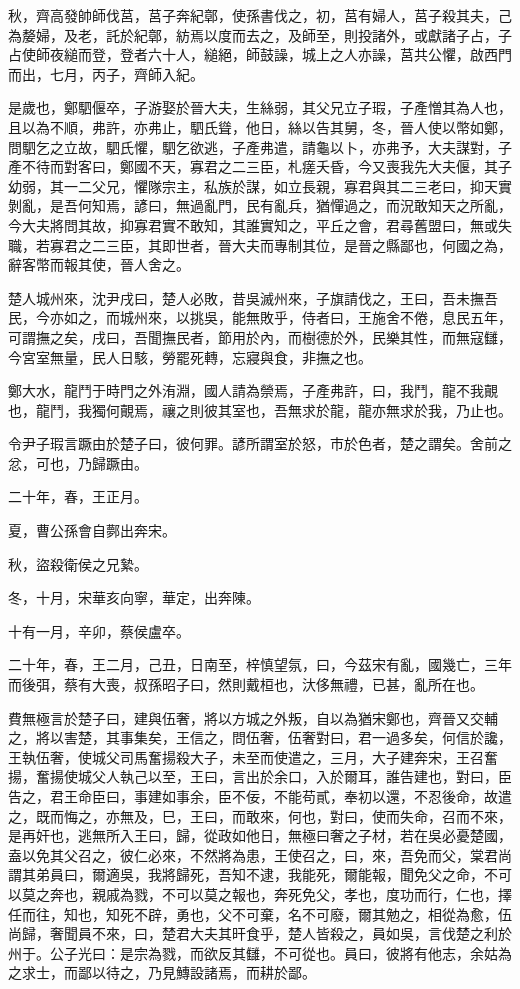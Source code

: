\begin{pinyinscope}
秋，齊高發帥師伐莒，莒子奔紀鄣，使孫書伐之，初，莒有婦人，莒子殺其夫，己為嫠婦，及老，託於紀鄣，紡焉以度而去之，及師至，則投諸外，或獻諸子占，子占使師夜縋而登，登者六十人，縋絕，師鼓譟，城上之人亦譟，莒共公懼，啟西門而出，七月，丙子，齊師入紀。

是歲也，鄭駟偃卒，子游娶於晉大夫，生絲弱，其父兄立子瑕，子產憎其為人也，且以為不順，弗許，亦弗止，駟氏聳，他日，絲以告其舅，冬，晉人使以幣如鄭，問駟乞之立故，駟氏懼，駟乞欲逃，子產弗遣，請龜以卜，亦弗予，大夫謀對，子產不待而對客曰，鄭國不天，寡君之二三臣，札瘥夭昏，今又喪我先大夫偃，其子幼弱，其一二父兄，懼隊宗主，私族於謀，如立長親，寡君與其二三老曰，抑天實剝亂，是吾何知焉，諺曰，無過亂門，民有亂兵，猶憚過之，而況敢知天之所亂，今大夫將問其故，抑寡君實不敢知，其誰實知之，平丘之會，君尋舊盟曰，無或失職，若寡君之二三臣，其即世者，晉大夫而專制其位，是晉之縣鄙也，何國之為，辭客幣而報其使，晉人舍之。

楚人城州來，沈尹戌曰，楚人必敗，昔吳滅州來，子旗請伐之，王曰，吾未撫吾民，今亦如之，而城州來，以挑吳，能無敗乎，侍者曰，王施舍不倦，息民五年，可謂撫之矣，戌曰，吾聞撫民者，節用於內，而樹德於外，民樂其性，而無寇讎，今宮室無量，民人日駭，勞罷死轉，忘寢與食，非撫之也。

鄭大水，龍鬥于時門之外洧淵，國人請為禜焉，子產弗許，曰，我鬥，龍不我覿也，龍鬥，我獨何覿焉，禳之則彼其室也，吾無求於龍，龍亦無求於我，乃止也。

令尹子瑕言蹶由於楚子曰，彼何罪。諺所謂室於怒，市於色者，楚之謂矣。舍前之忿，可也，乃歸蹶由。

二十年，春，王正月。

夏，曹公孫會自鄸出奔宋。

秋，盜殺衛侯之兄縶。

冬，十月，宋華亥向寧，華定，出奔陳。

十有一月，辛卯，蔡侯盧卒。

二十年，春，王二月，己丑，日南至，梓慎望氛，曰，今茲宋有亂，國幾亡，三年而後弭，蔡有大喪，叔孫昭子曰，然則戴桓也，汏侈無禮，已甚，亂所在也。

費無極言於楚子曰，建與伍奢，將以方城之外叛，自以為猶宋鄭也，齊晉又交輔之，將以害楚，其事集矣，王信之，問伍奢，伍奢對曰，君一過多矣，何信於讒，王執伍奢，使城父司馬奮揚殺大子，未至而使遣之，三月，大子建奔宋，王召奮揚，奮揚使城父人執己以至，王曰，言出於余口，入於爾耳，誰告建也，對曰，臣告之，君王命臣曰，事建如事余，臣不佞，不能苟貳，奉初以還，不忍後命，故遣之，既而悔之，亦無及，巳，王曰，而敢來，何也，對曰，使而失命，召而不來，是再奸也，逃無所入王曰，歸，從政如他日，無極曰奢之子材，若在吳必憂楚國，盍以免其父召之，彼仁必來，不然將為患，王使召之，曰，來，吾免而父，棠君尚謂其弟員曰，爾適吳，我將歸死，吾知不逮，我能死，爾能報，聞免父之命，不可以莫之奔也，親戚為戮，不可以莫之報也，奔死免父，孝也，度功而行，仁也，擇任而往，知也，知死不辟，勇也，父不可棄，名不可廢，爾其勉之，相從為愈，伍尚歸，奢聞員不來，曰，楚君大夫其旰食乎，楚人皆殺之，員如吳，言伐楚之利於州于。公子光曰：是宗為戮，而欲反其讎，不可從也。員曰，彼將有他志，余姑為之求士，而鄙以待之，乃見鱄設諸焉，而耕於鄙。


\end{pinyinscope}
